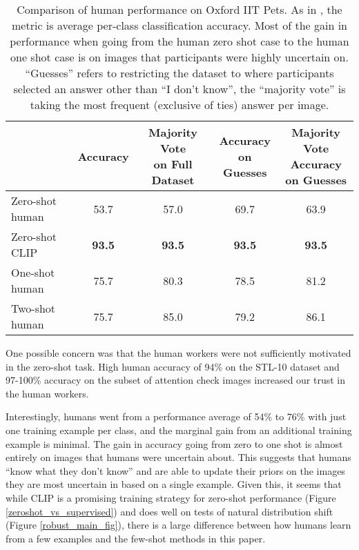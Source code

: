 \documentclass{article}
\begin{document}
\begin{table}[t]
\vskip 0.15in
\scriptsize
\begin{center}
\begin{tabular}{lcccc}
\toprule
 & \hspace{-0.5em} Accuracy \hspace{-0.5em} & \hspace{-0.5em} \makecell{Majority Vote \\ on Full Dataset} \hspace{-0.5em} & \hspace{-0.5em} \makecell{Accuracy \\ on Guesses} \hspace{-0.5em} & \hspace{-0.5em} \makecell{Majority Vote \\ Accuracy \\ on Guesses} \hspace{-0.5em}  \\
\midrule
Zero-shot human & 53.7 & 57.0 & 69.7 &  63.9 \\
Zero-shot CLIP & \textbf{93.5} & \textbf{93.5} & \textbf{93.5} & \textbf{93.5} \\
One-shot human & 75.7 & 80.3 & 78.5 & 81.2 \\
Two-shot human & 75.7 & 85.0 & 79.2 & 86.1 \\
\bottomrule
\end{tabular}
\caption{Comparison of human performance on Oxford IIT Pets. As in \citet{parkhi12a}, the metric is average per-class classification accuracy. Most of the gain in performance when going from the human zero shot case to the human one shot case is on images that participants were highly uncertain on. ``Guesses'' refers to restricting the dataset to where participants selected an answer other than ``I don't know'', the ``majority vote'' is taking the most frequent (exclusive of ties) answer per image.}
\label{human-performance-on-pets}
\end{center}
\vskip -0.1in
\end{table}

One possible concern was that the human workers were not sufficiently motivated in the zero-shot task. High human accuracy of 94\% on the STL-10 dataset \cite{coates2011analysis} and 97-100\% accuracy on the subset of attention check images increased our trust in the human workers.

Interestingly, humans went from a performance average of 54\% to 76\% with just one training example per class, and the marginal gain from an additional training example is minimal. The gain in accuracy going from zero to one shot is almost entirely on images that humans were uncertain about. This suggests that humans ``know what they don't know'' and are able to update their priors on the images they are most uncertain in based on a single example. Given this, it seems that while CLIP is a promising training strategy for zero-shot performance (Figure \ref{zeroshot_vs_supervised}) and does well on tests of natural distribution shift (Figure \ref{robust_main_fig}), there is a large difference between how humans learn from a few examples and the few-shot methods in this paper.
\end{document}
